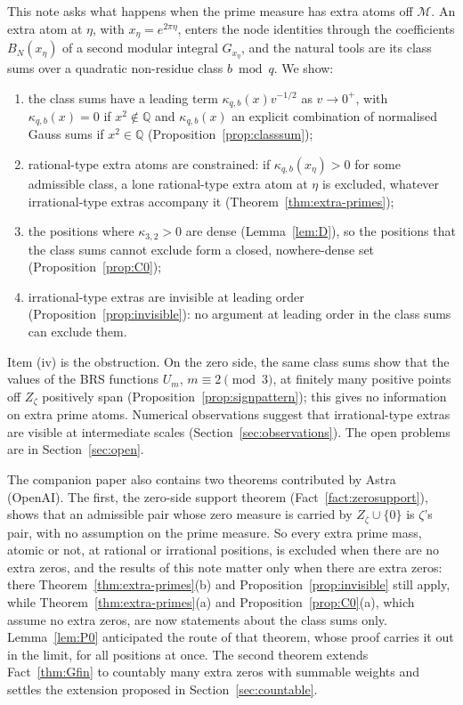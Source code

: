 \documentclass[11pt]{amsart}
\newcommand{\QQ}{\mathbb Q}
\newcommand{\BRS}{\mathcal M}
\newcommand{\Zz}{Z_\zeta}
\theoremstyle{definition}
\theoremstyle{remark}
\numberwithin{equation}{section}
\begin{document}
This note asks what happens when the prime measure has extra atoms off $\BRS$. An extra atom at $\eta$, with $x_\eta=e^{2\pi\eta}$,
enters the node identities through the coefficients $B_N(x_\eta)$ of a second modular integral $G_{x_\eta}$, and the natural tools
are its class sums over a quadratic non-residue class $b\bmod q$. We show:
\begin{enumerate}[label=\textup{(\roman*)}]
\item the class sums have a leading term $\kappa_{q,b}(x)v^{-1/2}$ as $v\to0^+$, with $\kappa_{q,b}(x)=0$ if $x^2\notin\QQ$ and $\kappa_{q,b}(x)$ an
explicit combination of normalised Gauss sums if $x^2\in\QQ$ (Proposition~\ref{prop:classsum});
\item rational-type extra atoms are constrained: if $\kappa_{q,b}(x_\eta)>0$ for some admissible class, a lone rational-type extra atom
at $\eta$ is excluded, whatever irrational-type extras accompany it (Theorem~\ref{thm:extra-primes});
\item the positions where $\kappa_{3,2}>0$ are dense (Lemma~\ref{lem:D}), so the positions that the class sums cannot exclude form a closed,
nowhere-dense set (Proposition~\ref{prop:C0});
\item irrational-type extras are invisible at leading order (Proposition~\ref{prop:invisible}): no argument at leading order in the class
sums can exclude them.
\end{enumerate}
Item (iv) is the obstruction. On the zero side, the same class sums show that the values of the BRS functions $U_m$,
$m\equiv2\pmod3$, at finitely many positive points off $\Zz$ positively span (Proposition~\ref{prop:signpattern}); this gives no
information on extra prime atoms. Numerical observations suggest that irrational-type extras are visible at intermediate scales
(Section~\ref{sec:observations}). The open problems are in Section~\ref{sec:open}.

The companion paper also contains two theorems contributed by Astra (OpenAI). The first, the zero-side
support theorem (Fact~\ref{fact:zerosupport}), shows that an admissible pair whose zero measure is carried by $\Zz\cup\{0\}$ is
$\zeta$'s pair, with no assumption on the prime measure. So every extra prime mass, atomic or not, at rational or irrational
positions, is excluded when there are no extra zeros, and the results of this note matter only when there are extra zeros: there
Theorem~\ref{thm:extra-primes}(b) and Proposition~\ref{prop:invisible} still apply, while Theorem~\ref{thm:extra-primes}(a) and
Proposition~\ref{prop:C0}(a), which assume no extra zeros, are now statements about the class sums only. Lemma~\ref{lem:P0}
anticipated the route of that theorem, whose proof carries it out in the limit, for all positions at once. The second theorem extends
Fact~\ref{thm:Gfin} to countably many extra zeros with summable weights and settles the extension proposed in
Section~\ref{sec:countable}.
\end{document}
